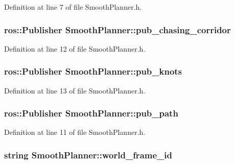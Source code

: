 Definition at line 7 of file Smooth\+Planner.\+h.

\subsubsection[{\texorpdfstring{pub\+\_\+chasing\+\_\+corridor}{pub_chasing_corridor}}]{\setlength{\rightskip}{0pt plus 5cm}ros\+::\+Publisher Smooth\+Planner\+::pub\+\_\+chasing\+\_\+corridor}\hypertarget{class_smooth_planner_a7cd9de34963f445a21a6d0101346b071}{}\label{class_smooth_planner_a7cd9de34963f445a21a6d0101346b071}


Definition at line 12 of file Smooth\+Planner.\+h.

\subsubsection[{\texorpdfstring{pub\+\_\+knots}{pub_knots}}]{\setlength{\rightskip}{0pt plus 5cm}ros\+::\+Publisher Smooth\+Planner\+::pub\+\_\+knots}\hypertarget{class_smooth_planner_a7ee67bceac6d60409542a2250b2ccd08}{}\label{class_smooth_planner_a7ee67bceac6d60409542a2250b2ccd08}


Definition at line 13 of file Smooth\+Planner.\+h.

\subsubsection[{\texorpdfstring{pub\+\_\+path}{pub_path}}]{\setlength{\rightskip}{0pt plus 5cm}ros\+::\+Publisher Smooth\+Planner\+::pub\+\_\+path}\hypertarget{class_smooth_planner_a7b8400f711456291e567d0fc204c274b}{}\label{class_smooth_planner_a7b8400f711456291e567d0fc204c274b}


Definition at line 11 of file Smooth\+Planner.\+h.

\subsubsection[{\texorpdfstring{world\+\_\+frame\+\_\+id}{world_frame_id}}]{\setlength{\rightskip}{0pt plus 5cm}string Smooth\+Planner\+::world\+\_\+frame\+\_\+id}\hypertarget{class_smooth_planner_ade278c4209b962d8342a2ee30e718c8b}{}\label{class_smooth_planner_ade278c4209b962d8342a2ee30e718c8b}


